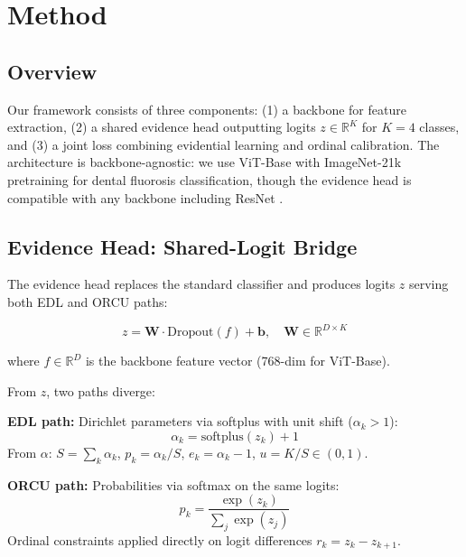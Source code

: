 \section{Method}

\subsection{Overview}

Our framework consists of three components: (1) a backbone for feature extraction, (2) a shared evidence head outputting logits $z \in \mathbb{R}^K$ for $K = 4$ classes, and (3) a joint loss combining evidential learning and ordinal calibration. The architecture is backbone-agnostic: we use ViT-Base \cite{dosovitskiy2020vit} with ImageNet-21k pretraining \cite{raghu2019transfusion} for dental fluorosis classification, though the evidence head is compatible with any backbone including ResNet \cite{he2016resnet}.

\subsection{Evidence Head: Shared-Logit Bridge}

The evidence head replaces the standard classifier and produces logits $z$ serving both EDL and ORCU paths:

\begin{equation}
    z = \mathbf{W} \cdot \text{Dropout}(f) + \mathbf{b}, \quad \mathbf{W} \in \mathbb{R}^{D \times K}
\end{equation}

where $f \in \mathbb{R}^D$ is the backbone feature vector (768-dim for ViT-Base).

From $z$, two paths diverge:

\textbf{EDL path:} Dirichlet parameters via softplus with unit shift ($\alpha_k > 1$):
\begin{equation}
    \alpha_k = \text{softplus}(z_k) + 1
\end{equation}
From $\alpha$: $S = \sum_k \alpha_k$, $p_k = \alpha_k / S$, $e_k = \alpha_k - 1$, $u = K / S \in (0, 1)$.

\textbf{ORCU path:} Probabilities via softmax on the same logits:
\begin{equation}
    p_k = \frac{\exp(z_k)}{\sum_j \exp(z_j)}
\end{equation}
Ordinal constraints applied directly on logit differences $r_k = z_k - z_{k+1}$.

